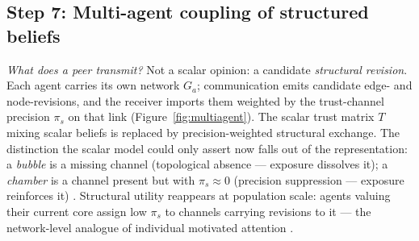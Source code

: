\subsection{Step 7: Multi-agent coupling of structured beliefs}
\label{ssec:multiagent}

\noindent\textit{What does a peer transmit?} Not a scalar opinion: a
candidate \emph{structural revision}. Each agent carries its own network
$G_a$; communication emits candidate edge- and node-revisions, and the
receiver imports them weighted by the trust-channel precision $\pi_s$ on
that link (Figure~\ref{fig:multiagent}). The scalar trust matrix $T$
mixing scalar beliefs is replaced by precision-weighted structural
exchange. The distinction the scalar model could only assert now falls
out of the representation: a \emph{bubble} is a missing channel
(topological absence --- exposure dissolves it); a \emph{chamber} is a
channel present but with $\pi_s \approx 0$ (precision suppression ---
exposure reinforces it) \citep{Nguyen2018_1, Pollock2024_3, Turner2023_2}.
Structural utility reappears at population scale: agents valuing their
current core assign low $\pi_s$ to channels carrying revisions to it ---
the network-level analogue of individual motivated attention
\citep{albarracin2022EpistemicCommunities}.

